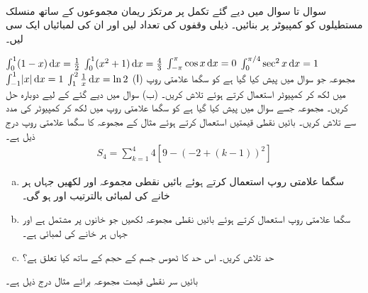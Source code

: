 \\
سوال  تا سوال  میں دیے گئے تکمل پر مرتکز ریمان مجموعوں کے ساتھ منسلک مستطیلوں کو کمپیوٹر پر  بنائیں۔ ذیلی وقفوں کی تعداد  لیں اور ان کی لمبائیاں ایک سی  لیں۔ 

$\int_0^1 (1-x)\dif x=\tfrac{1}{2}$
$\int_0^1(x^2+1)\dif x=\tfrac{4}{3}$
$\int_{-\pi}^{\pi}\cos x\dif x=0$
$\int_0^{\pi/4}\sec^2x\dif x=1$
$\int_{-1}^1\abs{x}\dif x=1$
$\int_1^2\tfrac{1}{x}\dif x=\ln 2$
(ا) مجموعہ  جو سوال  میں پیش کیا  گیا ہے کو سگما علامتی روپ میں لکھ کر کمپیوٹر استعمال کرتے ہوئے  تلاش کریں۔ (ب) سوال  میں دیے گئے  کے لیے دوبارہ حل کریں۔
مجموعہ  جسے سوال  میں پیش کیا گیا ہے کو سگما علامتی روپ میں لکھ کر کمپیوٹر کی مدد سے  تلاش کریں۔
بائیں نقطی قیمتیں استعمال کرتے ہوئے مثال  کے مجموعہ کا  سگما علامتی روپ درج ذیل ہے۔
\begin{align*}
S_4=\sum\limits_{k=1}^4 4[9-(-2+(k-1))^2]
\end{align*} 
\begin{enumerate}[a.]
\item
سگما علامتی روپ استعمال کرتے ہوئے بائیں نقطی مجموعہ  اور  لکھیں جہاں ہر خانے کی لمبائی بالترتیب  اور  ہو گی۔
\item
سگما علامتی روپ استعمال کرتے ہوئے بائیں نقطی مجموعہ  لکھیں جو   خانوں پر مشتمل ہے اور جہاں ہر خانے کی لمبائی  ہے۔ 
\item
حد  تلاش کریں۔ اس حد کا ٹھوس جسم کے حجم کے ساتھ کیا تعلق ہے؟
\end{enumerate}
بائیں سر نقطی قیمت مجموعہ برائے مثال  درج ذیل ہے۔
